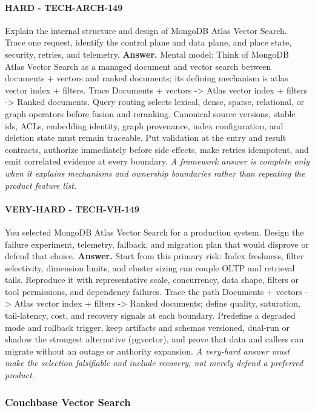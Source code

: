 \paragraph{HARD - TECH-ARCH-149} Explain the internal structure and design of MongoDB Atlas Vector Search. Trace one request, identify the control plane and data plane, and place state, security, retries, and telemetry.
\textbf{Answer.} Mental model: Think of MongoDB Atlas Vector Search as a managed document and vector search between documents + vectors and ranked documents; its defining mechanism is atlas vector index + filters. Trace Documents + vectors -> Atlas vector index + filters -> Ranked documents. Query routing selects lexical, dense, sparse, relational, or graph operators before fusion and reranking. Canonical source versions, stable ids, ACLs, embedding identity, graph provenance, index configuration, and deletion state must remain traceable. Put validation at the entry and result contracts, authorize immediately before side effects, make retries idempotent, and emit correlated evidence at every boundary.
\textit{A framework answer is complete only when it explains mechanisms and ownership boundaries rather than repeating the product feature list.}
\paragraph{VERY-HARD - TECH-VH-149} You selected MongoDB Atlas Vector Search for a production system. Design the failure experiment, telemetry, fallback, and migration plan that would disprove or defend that choice.
\textbf{Answer.} Start from this primary risk: Index freshness, filter selectivity, dimension limits, and cluster sizing can couple OLTP and retrieval tails. Reproduce it with representative scale, concurrency, data shape, filters or tool permissions, and dependency failures. Trace the path Documents + vectors -> Atlas vector index + filters -> Ranked documents; define quality, saturation, tail-latency, cost, and recovery signals at each boundary. Predefine a degraded mode and rollback trigger, keep artifacts and schemas versioned, dual-run or shadow the strongest alternative (pgvector), and prove that data and callers can migrate without an outage or authority expansion.
\textit{A very-hard answer must make the selection falsifiable and include recovery, not merely defend a preferred product.}
\subsubsection*{Couchbase Vector Search}
